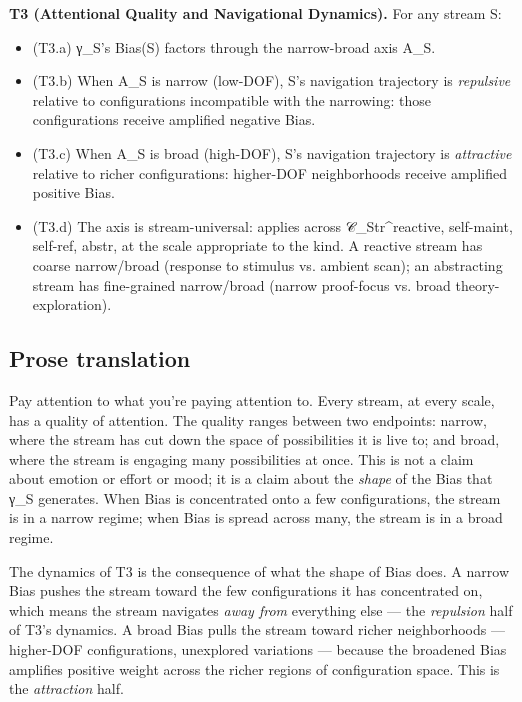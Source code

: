 \documentclass[11pt, openany]{book}
\begin{document}
\textbf{T3 (Attentional Quality and Navigational Dynamics).} For any stream S:

\begin{itemize}
\item (T3.a) γ\_\allowbreak{}S's Bias(S) factors through the narrow-broad axis A\_\allowbreak{}S.
\item (T3.b) When A\_\allowbreak{}S is narrow (low-DOF), S's navigation trajectory is \textit{repulsive} relative to configurations incompatible with the narrowing: those configurations receive amplified negative Bias.
\item (T3.c) When A\_\allowbreak{}S is broad (high-DOF), S's navigation trajectory is \textit{attractive} relative to richer configurations: higher-DOF neighborhoods receive amplified positive Bias.
\item (T3.d) The axis is stream-universal: applies across 𝒞\_\allowbreak{}Str\textasciicircum{}reactive, self-maint, self-ref, abstr, at the scale appropriate to the kind. A reactive stream has coarse narrow/broad (response to stimulus vs. ambient scan); an abstracting stream has fine-grained narrow/broad (narrow proof-focus vs. broad theory-exploration).
\end{itemize}

\subsection{Prose translation}

Pay attention to what you're paying attention to. Every stream, at every scale, has a quality of attention. The quality ranges between two endpoints: narrow, where the stream has cut down the space of possibilities it is live to; and broad, where the stream is engaging many possibilities at once. This is not a claim about emotion or effort or mood; it is a claim about the \textit{shape} of the Bias that γ\_\allowbreak{}S generates. When Bias is concentrated onto a few configurations, the stream is in a narrow regime; when Bias is spread across many, the stream is in a broad regime.

The dynamics of T3 is the consequence of what the shape of Bias does. A narrow Bias pushes the stream toward the few configurations it has concentrated on, which means the stream navigates \textit{away from} everything else --- the \textit{repulsion} half of T3's dynamics. A broad Bias pulls the stream toward richer neighborhoods --- higher-DOF configurations, unexplored variations --- because the broadened Bias amplifies positive weight across the richer regions of configuration space. This is the \textit{attraction} half.
\end{document}
